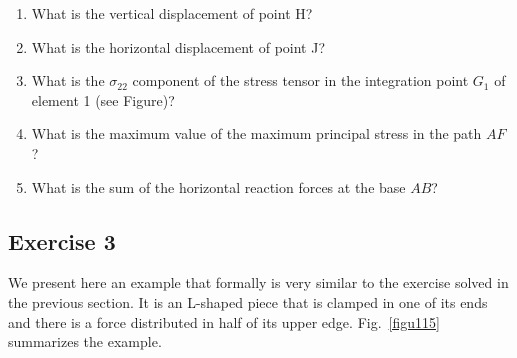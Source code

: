 \begin{enumerate}
\item What is the vertical displacement of point H?
  \begin{multicols}{4}
\columnbreak
{}
\columnbreak
{}
\columnbreak
{}
  \end{multicols}
\item What is the horizontal displacement of point J?
  \begin{multicols}{4}
\columnbreak
{} %
\columnbreak
{}
\columnbreak
{}
  \end{multicols}
\item What is the $\sigma_{22}$ component of the stress tensor in the integration point $G_1$ of element 1 (see Figure)?
  \begin{multicols}{4}
\columnbreak
{}
\columnbreak
{}
\columnbreak
{}
  \end{multicols}
\item What is the maximum value of the maximum principal stress in the path $AF$?
  \begin{multicols}{4}
\columnbreak
{} %
\columnbreak
{}
\columnbreak
{}
\end{multicols}
\item What is the sum of the horizontal reaction forces at the base $AB$?
  \begin{multicols}{4}
\columnbreak
{}
\columnbreak
{}
\columnbreak
{}
  \end{multicols}
\end{enumerate}
\newpage
\subsection{Exercise 3}
We present here an example that formally is very similar to the
exercise solved in the previous section. It is an L-shaped piece that
is clamped in one of its ends and there is a force distributed in half
of its upper edge. Fig.~\ref{figu115} summarizes the example.


